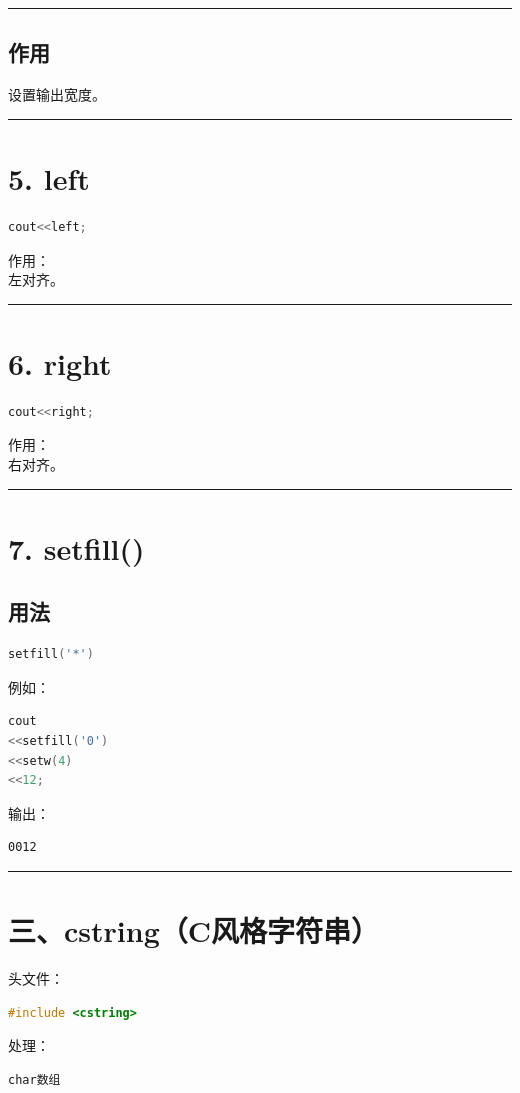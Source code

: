 \documentclass[9pt,twocolumn]{extarticle}
\begin{document}
\noindent\rule{\linewidth}{0.4pt}

\subsection{作用}
设置输出宽度。

\noindent\rule{\linewidth}{0.4pt}

\section{5. left}
\begin{lstlisting}[language=C++]
cout<<left;
\end{lstlisting}
作用：\\
左对齐。

\noindent\rule{\linewidth}{0.4pt}

\section{6. right}
\begin{lstlisting}[language=C++]
cout<<right;
\end{lstlisting}
作用：\\
右对齐。

\noindent\rule{\linewidth}{0.4pt}

\section{7. setfill()}

\subsection{用法}
\begin{lstlisting}[language=C++]
setfill('*')
\end{lstlisting}
例如：
\begin{lstlisting}[language=C++]
cout
<<setfill('0')
<<setw(4)
<<12;
\end{lstlisting}
输出：
\begin{lstlisting}
0012
\end{lstlisting}

\noindent\rule{\linewidth}{0.4pt}

\section{三、cstring（C风格字符串）}

头文件：
\begin{lstlisting}[language=C++]
#include <cstring>
\end{lstlisting}
处理：
\begin{lstlisting}[language=C++]
char数组
\end{lstlisting}
\end{document}
